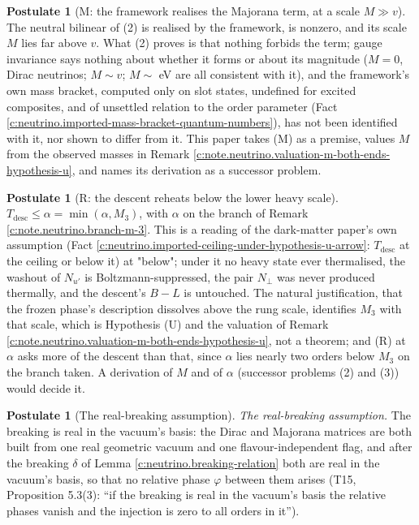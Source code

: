 \documentclass[11pt]{article}
\theoremstyle{definition}
\newtheorem{postulate}[theorem]{Postulate}
\theoremstyle{plain}
\newcommand{\changedmark}[2]{\marginpar{\raggedright\scriptsize\color{#1}#2}}
\begin{document}
\begin{postulate}[M: the framework realises the Majorana term, at a scale $M \gg v$]\label{c:neutrino.m-framework-realises-majorana-term-scale}
The neutral bilinear of (2) is realised by the framework, is nonzero, and its scale $M$ lies far above $v$. What (2) proves is that nothing forbids the term; gauge invariance says nothing about whether it forms or about its magnitude ($M = 0$, Dirac neutrinos; $M \sim v$; $M \sim$ eV are all consistent with it), and the framework's own mass bracket, computed only on slot states, undefined for excited composites, and of unsettled relation to the order parameter (Fact \ref{c:neutrino.imported-mass-bracket-quantum-numbers}), has not been identified with it, nor shown to differ from it. This paper takes (M) as a premise, values $M$ from the observed masses in Remark \ref{c:note.neutrino.valuation-m-both-ends-hypothesis-u}, and names its derivation as a successor problem.
\end{postulate}

\begin{postulate}[R: the descent reheats below the lower heavy scale]\label{c:neutrino.r-descent-reheats-below-lower-heavy}
$T_{\mathrm{desc}} \le \alpha = \min(\alpha, M_{3})$, with $\alpha$ on the branch of Remark \ref{c:note.neutrino.branch-m-3}. This is a reading of the dark-matter paper's own assumption (Fact \ref{c:neutrino.imported-ceiling-under-hypothesis-u-arrow}: $T_{\mathrm{desc}}$ at the ceiling or below it) at "below"; under it no heavy state ever thermalised, the washout of $N_{u'}$ is Boltzmann-suppressed, the pair $N_{\perp}$ was never produced thermally, and the descent's $B - L$ is untouched. The natural justification, that the frozen phase's description dissolves above the rung scale, identifies $M_{3}$ with that scale, which is Hypothesis (U) and the valuation of Remark \ref{c:note.neutrino.valuation-m-both-ends-hypothesis-u}, not a theorem; and (R) at $\alpha$ asks more of the descent than that, since $\alpha$ lies nearly two orders below $M_{3}$ on the branch taken. A derivation of $M$ and of $\alpha$ (successor problems (2) and (3)) would decide it.
\end{postulate}

\begin{postulate}[The real-breaking assumption]\label{c:neutrino.real-breaking-assumption}
\changedmark{BurntOrange}{changed since the deposit}
\emph{The real-breaking assumption.} The breaking is real in the vacuum's basis: the Dirac and Majorana matrices are both built from one real geometric vacuum and one flavour-independent flag, and after the breaking $\delta$ of Lemma \ref{c:neutrino.breaking-relation} both are real in the vacuum's basis, so that no relative phase $\varphi$ between them arises (T15, Proposition 5.3(3): ``if the breaking is real in the vacuum's basis the relative phases vanish and the injection is zero to all orders in it'').
\end{postulate}
\end{document}
